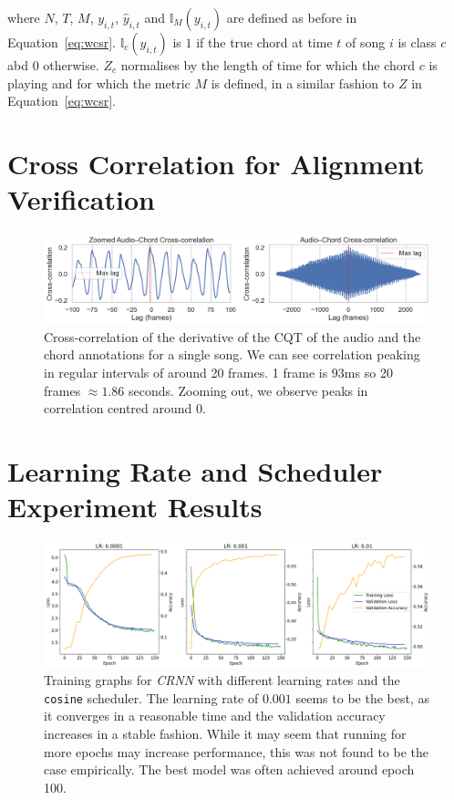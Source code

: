 where $N$, $T$, $M$, $y_{i,t}$, $\hat{y}_{i,t}$ and $\mathbb{I}_M(y_{i,t})$ are defined as before in Equation~\ref{eq:wcsr}. $\mathbb{I}_c(y_{i,t})$ is $1$ if the true chord at time $t$ of song $i$ is class $c$ abd $0$ otherwise. $Z_c$ normalises by the length of time for which the chord $c$ is playing and for which the metric $M$ is defined, in a similar fashion to $Z$ in Equation~\ref{eq:wcsr}.

\section{Cross Correlation for Alignment Verification}\label{app:cross_correlation}

\begin{figure}[H]
    \centering
    \includegraphics[width=1.0\textwidth]{figures/cross_correlation.png}
    \caption{Cross-correlation of the derivative of the CQT of the audio and the chord annotations for a single song. We can see correlation peaking in regular intervals of around 20 frames. 1 frame is $93$ms so 20 frames $\approx 1.86$ seconds. Zooming out, we observe peaks in correlation centred around 0.}\label{fig:cross-correlation}
\end{figure}

\section{Learning Rate and Scheduler Experiment Results}\label{app:learning_experiment_results}

\begin{figure}[H]
    \centering
    \includegraphics[width=1.0\textwidth]{figures/lr_search_cosine.png}
    \caption{Training graphs for \emph{CRNN} with different learning rates and the \texttt{cosine} scheduler. The learning rate of $0.001$ seems to be the best, as it converges in a reasonable time and the validation accuracy increases in a stable fashion. While it may seem that running for more epochs may increase performance, this was not found to be the case empirically. The best model was often achieved around epoch 100.}\label{fig:lr_search_cosine}
\end{figure}

